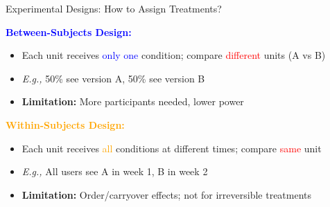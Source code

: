 \documentclass{beamer}
\newcommand{\blue}[1]{\textcolor{blue}{#1}}
\newcommand{\red}[1]{\textcolor{red}{#1}}
\newcommand{\orange}[1]{\textcolor{orange}{#1}}
\begin{document}
\begin{frame}{Experimental Designs: How to Assign Treatments? }

\textbf{\blue{Between-Subjects Design:}}
\begin{itemize}
    \item Each unit receives \blue{only one} condition; compare \red{different} units (A vs B)
    \item \textit{E.g.,} 50\% see version A, 50\% see version B
    \item \textbf{Limitation:} More participants needed, lower power
\end{itemize}
\textbf{\orange{Within-Subjects Design:}}
\begin{itemize}
    \item Each unit receives \orange{all} conditions at different times; compare \red{same} unit
    \item \textit{E.g.,} All users see A in week 1, B in week 2
    \item \textbf{Limitation:} Order/carryover effects; not for irreversible treatments
\end{itemize}
\end{frame}




\end{document}
